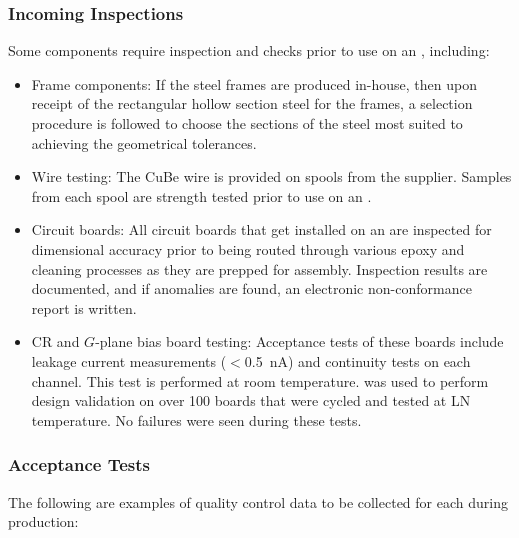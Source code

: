 \subsubsection{Incoming Inspections}

Some components require inspection and  checks prior to use on an , including:

\begin{itemize}

\item Frame components: If the  steel frames are produced in-house, then upon receipt of the rectangular hollow section steel for the frames, a selection procedure is followed to choose the sections of the steel most suited to achieving the geometrical tolerances. 

\item Wire testing: The CuBe wire is provided on spools from the supplier. Samples from each spool are strength tested prior to use on an .

\item Circuit boards: All circuit boards that get installed on an  are inspected for dimensional accuracy prior to being routed through various epoxy and cleaning processes as they are prepped for assembly. Inspection results are documented, and if anomalies are found, an electronic non-conformance report is written.  %

\item CR and $G$-plane bias board testing: Acceptance tests of these boards include leakage current measurements ($<$\SI{0.5}{nA}) and continuity tests on each channel.  This test is performed at room temperature.  was used to perform design validation on over \num{100} boards that were cycled and tested at LN temperature. No failures were seen during these tests. 

\end{itemize}

\subsubsection{ Acceptance Tests} 

The following are examples of quality control data to be collected for each  during production:  

